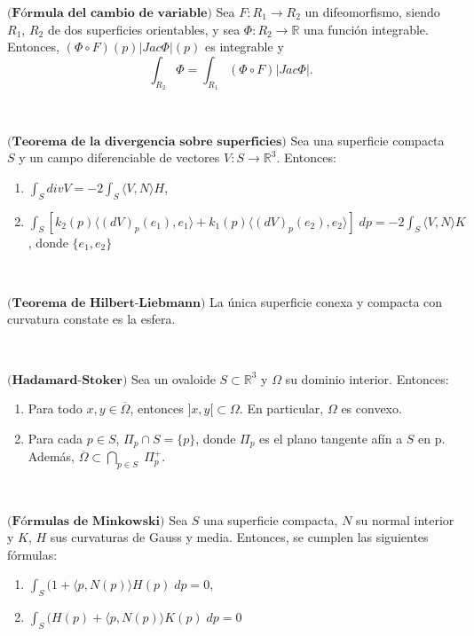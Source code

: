 \begin{teorema}
	$\textbf{(Fórmula del cambio de variable)}$ Sea $F : R_1 \to R_2$ un difeomorfismo, siendo $R_1$, $R_2$ de dos superficies orientables, y sea $\Phi : R_2 \to \mathbb{R}$ una función integrable. Entonces, $(\Phi \circ F)(p)|Jac \Phi|(p)$ es integrable y
	\[
	\int_{R_2} \Phi = \int_{R_1} (\Phi \circ F)|Jac \Phi|.
	\]
\end{teorema}
${ }$\\

\begin{teorema}\label{teo:divergencia}
	$\textbf{(Teorema de la divergencia sobre superficies)}$ Sea una superficie compacta $S$ y un campo diferenciable de vectores $V : S \to \mathbb{R}^3$. Entonces:
	\begin{enumerate}
		\item $\int_S div V = -2 \int_S \langle V, N \rangle H$,
		\item $\int_S [k_2(p) \langle (dV)_p(e_1), e_1\rangle + k_1(p) \langle (dV)_p(e_2), e_2 \rangle ] \; dp = -2 \int_S \langle V, N \rangle K$, donde $\{ e_1, e_2 \}$
	\end{enumerate}
\end{teorema}
${ }$\\

\begin{teorema} \label{teo:hil-lie}
	$\textbf{(Teorema de Hilbert-Liebmann)}$ La única superficie conexa y compacta con curvatura constate es la esfera.
\end{teorema}
${ }$\\

\begin{teorema} \label{teo:hadamard}
	$\textbf{(Hadamard-Stoker)}$ Sea un ovaloide $S \subset \mathbb{R}^3$ y $\Omega$ su dominio interior. Entonces:
	
	\begin{enumerate}
		\item Para todo $x, y \in \overline{\Omega}$, entonces $]x, y[ \subset \Omega$. En particular, $\Omega$ es convexo.
		\item Para cada $p \in S$, $\Pi_p \cap S = \{p\}$, donde $\Pi_p$ es el plano tangente afín a $S$ en p. Además, $\overline{\Omega} \subset \bigcap_{p \in S} \; \Pi^{+}_{p}$.
	\end{enumerate}
\end{teorema}
${ }$\\

\begin{teorema}
	$\textbf{(Fórmulas de Minkowski)}$ Sea $S$ una superficie compacta, $N$ su normal interior y $K$, $H$ sus curvaturas de Gauss y media. Entonces, se cumplen las siguientes fórmulas:
	\begin{enumerate}
		\item $\int_S (1 + \langle p, N(p) \rangle H(p) \; dp = 0$,
		\item $\int_S (H(p) + \langle p, N(p) \rangle K(p) \; dp = 0$
	\end{enumerate}
\end{teorema}
${ }$\\


